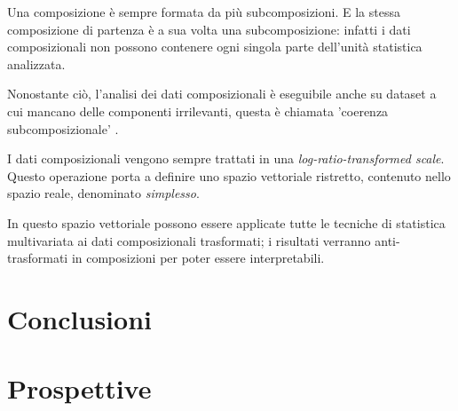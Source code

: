 \documentclass[11pt, a4paper, openright, titlepage, final, language = italian]{book}
\begin{document}
Una composizione \`e sempre formata da pi\`u subcomposizioni. E la
stessa composizione di partenza \`e a sua volta una subcomposizione:
infatti i dati composizionali non possono contenere ogni singola parte
dell'unit\`a statistica analizzata.

Nonostante ci\`o, l'analisi dei dati composizionali \`e eseguibile
anche su dataset a cui mancano delle componenti irrilevanti, questa
\`e chiamata 'coerenza subcomposizionale'
\citep{aitchison1986statistical}.

I dati composizionali vengono sempre trattati in una
\emph{log-ratio-transformed scale}. Questo operazione porta a definire
uno spazio vettoriale ristretto, contenuto nello spazio reale,
denominato \emph{simplesso}.

In questo spazio vettoriale possono essere applicate tutte le tecniche
di statistica multivariata ai dati composizionali trasformati; i
risultati verranno anti-trasformati in composizioni per poter essere
interpretabili.

\chapter{Conclusioni}

\chapter{Prospettive}
\end{document}
